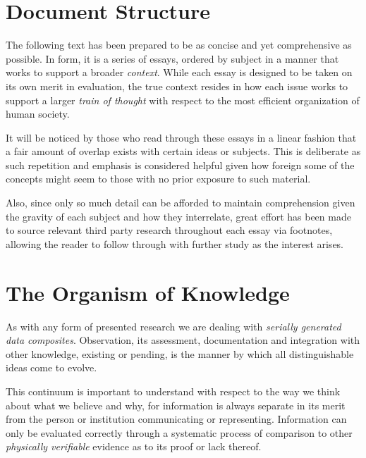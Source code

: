 \documentclass[10pt, a4paper, cleardoubleempty, openright, twoside]{book}
\begin{document}
\section* {Document Structure}
The following text has been prepared to be as concise and yet
comprehensive as possible. In form, it is a series of essays, ordered by
subject in a manner that works to support a broader \emph{context}.
While each essay is designed to be taken on its own merit in evaluation,
the true context resides in how each issue works to support a larger
\emph{train of thought} with respect to the most efficient organization
of human society.

It will be noticed by those who read through these essays in a linear
fashion that a fair amount of overlap exists with certain ideas or
subjects. This is deliberate as such repetition and emphasis is
considered helpful given how foreign some of the concepts might seem to
those with no prior exposure to such material.

Also, since only so much detail can be afforded to maintain
comprehension given the gravity of each subject and how they
interrelate, great effort has been made to source relevant third party
research throughout each essay via footnotes, allowing the reader to
follow through with further study as the interest arises.

\section* {The Organism of Knowledge}
As with any form of presented research we are dealing with
\emph{serially generated data composites}. Observation, its assessment,
documentation and integration with other knowledge, existing or pending,
is the manner by which all distinguishable ideas come to evolve.

This continuum is important to understand with respect to the way we
think about what we believe and why, for information is always separate
in its merit from the person or institution communicating or
representing. Information can only be evaluated correctly through a
systematic process of comparison to other \emph{physically verifiable}
evidence as to its proof or lack thereof.
\end{document}
